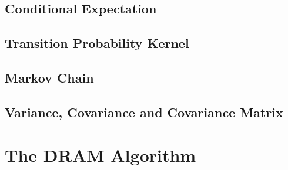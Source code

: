 \subsection{Conditional Expectation}

\subsection{Transition Probability Kernel}

\subsection{Markov Chain}

\subsection{Variance, Covariance and Covariance Matrix}

\section{The DRAM Algorithm}\label{sc-gmc-dram-alg}

